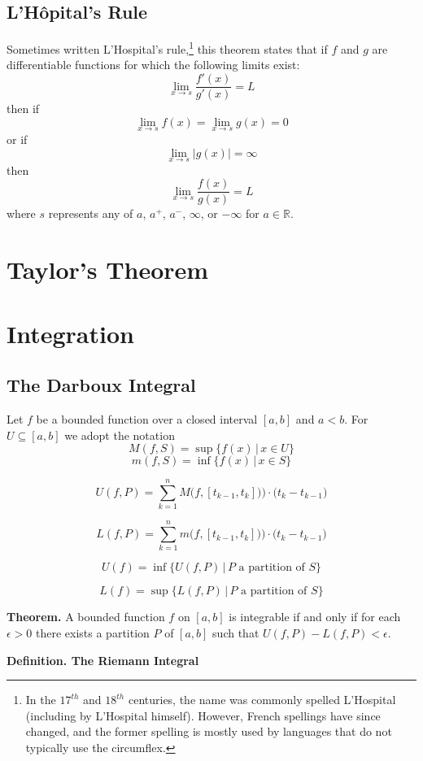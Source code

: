 \documentclass[12pt]{article}
\newcommand{\R}{\mathbb{R}}
\begin{document}
\subsection{L'Hôpital's Rule}

Sometimes written L'Hospital's rule,\footnote{In the $17^{th}$ and $18^{th}$ centuries, the name was commonly spelled L'Hospital (including by L'Hospital himself). However, French spellings have since changed, and the former spelling is mostly used by languages that do not typically use the circumflex.} this theorem states that if $f$ and $g$ are differentiable functions for which the following limits exist: $$\lim_{x \to s} \frac{f'(x)}{g'(x)} = L$$ then if $$\lim_{x \to s} f(x) = \lim_{x \to s} g(x) = 0$$ or if $$\lim_{x \to s} |g(x)| = \infty$$ then $$\lim_{x \to s} \frac{f(x)}{g(x)} = L $$ where $s$ represents any of $a$, $a^+$, $a^-$, $\infty$, or $-\infty$ for $a \in \R$.

\section{Taylor's Theorem}

\section{Integration}

\subsection{The Darboux Integral}

Let $f$ be a bounded function over a closed interval $[a,b]$ and $a<b$. For $U \subseteq [a,b]$ we adopt the notation $$M(f,S) = \sup \{ f(x) \, | \, x \in U \} $$ $$m(f,S) = \inf \{ f(x) \, | \, x \in S \} $$

$$U(f,P) = \sum_{k=1}^n M\big(f, [t_{k-1}, t_k ]) \big) \cdot \big( t_k - t_{k-1} \big) $$

$$L(f,P) = \sum_{k=1}^n m\big(f, [t_{k-1}, t_k ]) \big) \cdot \big( t_k - t_{k-1} \big) $$

$$U(f) = \inf \{ U(f,P) \, | \, P \text{ a partition of } S \}$$

$$L(f) = \sup \{ L(f,P) \, | \, P \text{ a partition of } S \}$$

\textbf{Theorem.} A bounded function $f$ on $[a,b]$ is integrable if and only if for each $\epsilon > 0$ there exists a partition $P$ of $[a,b]$ such that $U(f,P) - L(f,P) < \epsilon$.

\textbf{Definition. The Riemann Integral}
\end{document}
